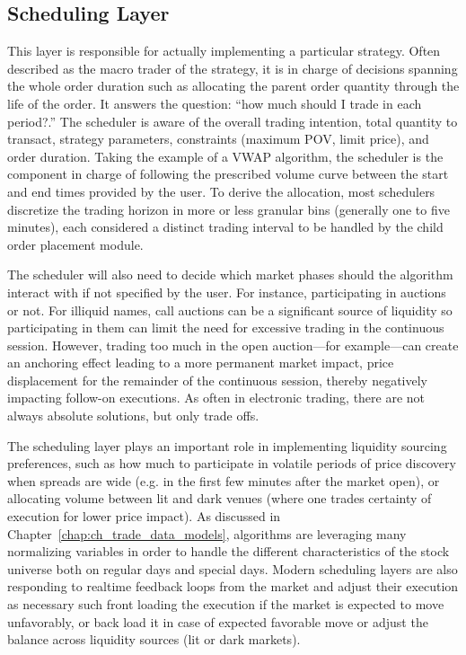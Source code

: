 \subsection{Scheduling Layer}

This layer is responsible for actually implementing a particular strategy. Often described as the macro trader of the strategy, it is in charge of decisions spanning the whole order duration such as allocating the parent order quantity through the life of the order. It answers the question: ``how much should I trade in each period?.'' The scheduler is aware of the overall trading intention, total quantity to transact, strategy parameters, constraints (maximum POV, limit price), and order duration. Taking the example of a VWAP algorithm, the scheduler is the component in charge of following the prescribed volume curve between the start and end times provided by the user. To derive the allocation, most schedulers discretize the trading horizon in more or less granular bins (generally one to five minutes), each considered a distinct trading interval to be handled by the child order placement module.


The scheduler will also need to decide which market phases should the algorithm interact with if not specified by the user. For instance, participating in auctions or not. For illiquid names, call auctions can be a significant source of liquidity so participating in them can limit the need for excessive trading in the continuous session. However, trading too much in the open auction---for example---can create an anchoring effect leading to a more permanent market impact, price displacement for the remainder of the continuous session, thereby negatively impacting follow-on executions. As often in electronic trading, there are not always absolute solutions, but only trade offs.


The scheduling layer plays an important role in  implementing liquidity sourcing preferences, such as how much to participate in volatile periods of price discovery when spreads are wide (e.g. in the first few minutes after the market open), or allocating volume between lit and dark venues (where one trades certainty of execution for lower price impact). As discussed in Chapter~\ref{chap:ch_trade_data_models}, algorithms are leveraging many normalizing  variables in order to handle the different characteristics of the stock universe both on regular days and special days.  Modern scheduling layers are also responding to realtime feedback loops from the market and adjust their execution as necessary such front loading the execution if the market is expected to move unfavorably, or back load it in case of expected favorable move or adjust the balance across liquidity sources (lit or dark markets). 


